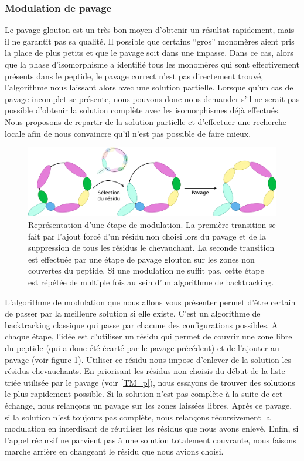 \subsubsection{Modulation de pavage}

Le pavage glouton est un très bon moyen d'obtenir un résultat rapidement, mais il ne garantit pas sa qualité.
Il possible que certains ``gros'' monomères aient pris la place de plus petits et que le pavage soit dans une impasse.
Dans ce cas, alors que la phase d'isomorphisme a identifié tous les monomères qui sont effectivement présents dans le peptide, le pavage correct n'est pas directement trouvé, l'algorithme nous laissant alors avec une solution partielle.
Lorsque qu'un cas de pavage incomplet se présente, nous pouvons donc nous demander s'il ne serait pas possible d'obtenir la solution complète avec les isomorphismes déjà effectués.
Nous proposons de repartir de la solution partielle et d'effectuer une recherche locale afin de nous convaincre qu'il n'est pas possible de faire mieux.

\begin{figure}[!ht]
  \begin{center}
    \includegraphics[width=450px]{Figures/s2m/pavage/modulation.png}
    \caption{\label{modulation}Représentation d'une étape de modulation.
    La première transition se fait par l'ajout forcé d'un résidu non choisi lors du pavage et de la suppression de tous les résidus le chevauchant.
    La seconde transition est effectuée par une étape de pavage glouton sur les zones non couvertes du peptide.
    Si une modulation ne suffit pas, cette étape est répétée de multiple fois au sein d'un algorithme de backtracking.}
  \end{center}
\end{figure}

L'algorithme de modulation que nous allons vous présenter permet d'être certain de passer par la meilleure solution si elle existe.
C'est un algorithme de backtracking classique qui passe par chacune des configurations possibles.
A chaque étape, l'idée est d'utiliser un résidu qui permet de couvrir une zone libre du peptide (qui a donc été écarté par le pavage précédent) et de l'ajouter au pavage (voir figure \ref{modulation}).
Utiliser ce résidu nous impose d'enlever de la solution les résidus chevauchants.
En priorisant les résidus non choisis du début de la liste triée utilisée par le pavage (voir \ref{TM_p}), nous essayons de trouver des solutions le plus rapidement possible.
Si la solution n'est pas complète à la suite de cet échange, nous relançons un pavage sur les zones laissées libres.
Après ce pavage, si la solution n'est toujours pas complète, nous relançons récursivement la modulation en interdisant de réutiliser les résidus que nous avons enlevé.
Enfin, si l'appel récursif ne parvient pas à une solution totalement couvrante, nous faisons marche arrière en changeant le résidu que nous avions choisi.

